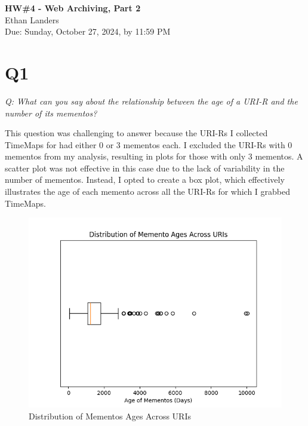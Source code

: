 \documentclass[12pt]{article}
\begin{document}
\begin{centering}
{\large\textbf{HW\#4 - Web Archiving, Part 2}}\\ 
Ethan Landers\\
Due: Sunday, October 27, 2024, by 11:59 PM\\
\end{centering}


\section*{Q1}

\emph{Q: What can you say about the relationship between the age of a URI-R and the number of its mementos?}

This question was challenging to answer because the URI-Rs I collected TimeMaps for had either 0 or 3 mementos each. I excluded the URI-Rs with 0 mementos from my analysis, resulting in plots for those with only 3 mementos. A scatter plot was not effective in this case due to the lack of variability in the number of mementos. Instead, I opted to create a box plot, which effectively illustrates the age of each memento across all the URI-Rs for which I grabbed TimeMaps.

\begin{figure}[h!]
    \centering
    \includegraphics[trim=0 0 0 25, clip, width=\textwidth] {boxplot.png}
    \caption{Distribution of Mementos Ages Across URIs}
    \label{fig:boxplot}
\end{figure}
\end{document}
